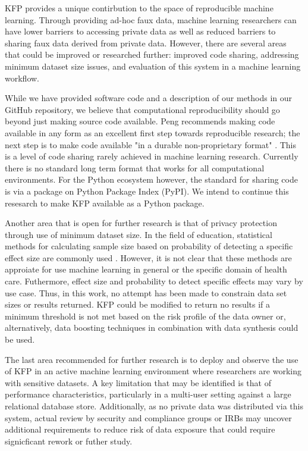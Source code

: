 \documentclass{article}
\begin{document}
KFP provides a unique contirbution to the space of reproducible machine learning. Through providing ad-hoc faux data, machine learning researchers can have lower barriers to accessing private data as well as reduced barriers to sharing faux data derived from private data. However, there are several areas that could be improved or researched further: improved code sharing, addressing minimum dataset size issues, and evaluation of this system in a machine learning workflow.

While we have provided software code and a description of our methods in our GitHub repository, we believe that computational reproducibility should go beyond just making source code available. Peng recommends  making code available in any form as an excellent first step towards reproducible research; the next step is to make code available "in a durable non-proprietary format" \cite{peng_reproducible_2011}. This is a level of code sharing rarely achieved in machine learning research. Currently there is no standard long term format that works for all computational environments. For the Python ecosystem however, the standard for sharing code is via a package on Python Package Index (PyPI). We intend to continue this resesarch to make KFP available as a Python package.

Another area that is open for further research is that of privacy protection through use of minimum dataset size. In the field of education, statistical methods for calculating sample size based on probability of detecting a specific effect size are commonly used \cite{naep_2009}. However, it is not clear that these methods are approiate for use machine learning in general or the specific domain of health care. Futhermore, effect size and probability to detect specific effects may vary by use case. Thus, in this work, no attempt has been made to constrain data set sizes or results returned. KFP could be modified to return no results if a minimum threshold is not met based on the risk profile of the data owner or, alternatively, data boosting techniques in combination with data synthesis could be used.

The last area recommended for further research is to deploy and observe the use of KFP in an active machine learning environment where researchers are working with sensitive datasets. A key limitation that may be identified is that of performance characteristics, particularly in a multi-user setting against a large relational database store. Additionally, as no private data was distributed via this system, actual review by security and compliance groups or IRBs may uncover additional requirements to reduce risk of data exposure that could require signicficant rework or futher study.
\end{document}
